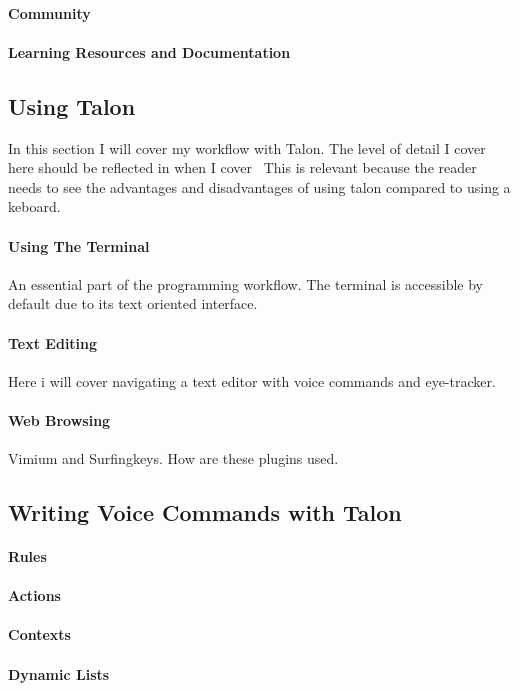 \documentclass[a4paper,english]{ifimaster}
\begin{document}
\paragraph{Community}
\paragraph{Learning Resources and Documentation}

\subsection{Using Talon}
In this section I will cover my workflow with Talon.
The level of detail I cover here should be reflected in when I cover~
This is relevant because the reader needs to see the advantages and disadvantages of using talon compared to using a keboard.
\paragraph{Using The Terminal}
An essential part of the programming workflow. The terminal is accessible by default due to its text oriented interface.
\paragraph{Text Editing}
Here i will cover navigating a text editor with voice commands and eye-tracker.
\paragraph{Web Browsing}
Vimium and Surfingkeys. How are these plugins used.

\subsection{Writing Voice Commands with Talon}\label{wvc}
\paragraph{Rules}
\paragraph{Actions}
\paragraph{Contexts}
\paragraph{Dynamic Lists}
\end{document}
